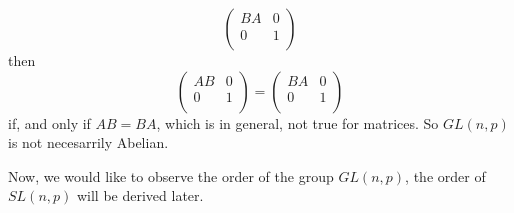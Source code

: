 \begin{example}
\begin{equation*}
        \begin{pmatrix}
            BA  &   0   \\
            0   &   1   \\
        \end{pmatrix}
    \end{equation*} then
    \begin{equation*}
        \begin{pmatrix}
            AB  &   0   \\
            0   &   1   \\
        \end{pmatrix}=
        \begin{pmatrix}
            BA  &   0   \\
            0   &   1   \\
        \end{pmatrix}
    \end{equation*}
    if, and only if $AB=BA$, which is in general, not true for matrices. So
    $GL(n,p)$ is not necesarrily Abelian.
\end{example}

Now, we would like to observe the order of the group $GL(n,p)$, the order of
$SL(n,p)$ will be derived later.

